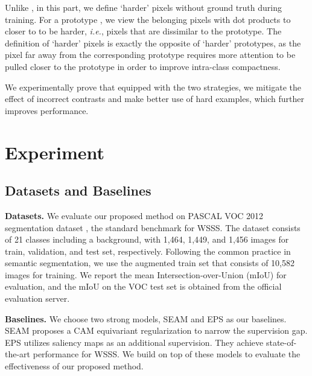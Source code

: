 \documentclass[10pt,twocolumn,letterpaper]{article}
\begin{document}
Unlike \cite{wang2021exploring_fully_supervised}, in this part, we define `harder' pixels without ground truth during training.
For a prototype , we view the belonging pixels with dot products to  closer to  to be harder, \textit{i.e.}, pixels that are dissimilar to the prototype.
The definition of `harder' pixels is exactly the opposite of `harder' prototypes, as the pixel far away from the corresponding prototype requires more attention to be pulled closer to the prototype in order to improve intra-class compactness.

We experimentally prove that equipped with the two strategies, we mitigate the effect of incorrect contrasts and make better use of hard examples, which further improves performance.


\section{Experiment}
\subsection{Datasets and Baselines}
\textbf{Datasets.} We evaluate our proposed method on PASCAL VOC 2012 segmentation dataset \cite{everingham2010pascalVOC2012}, the standard benchmark for WSSS.
The dataset consists of 21 classes including a background, with 1,464, 1,449, and 1,456 images for train, validation, and test set, respectively. Following the common practice in semantic segmentation, we use the augmented train set that consists of 10,582 images \cite{hariharan2011semanticVOCtrainaug} for training.
We report the mean Intersection-over-Union (mIoU) for evaluation, and the mIoU on the VOC test set is obtained from the official evaluation server. 



\textbf{Baselines.} We choose two strong models, SEAM \cite{wang2020selfSEAM} and EPS \cite{lee2021railroadEPS} as our baselines. SEAM proposes a CAM equivariant regularization to narrow the supervision gap.
EPS utilizes saliency maps as an additional supervision. They achieve state-of-the-art performance for WSSS. 
We build on top of these models to evaluate the effectiveness of our proposed method.
\end{document}

